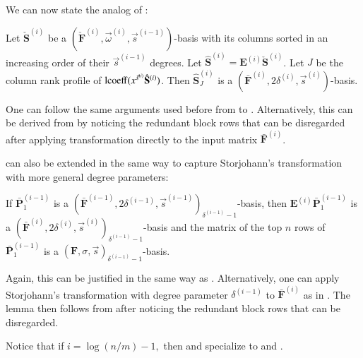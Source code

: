 We can now state the analog of : 
\begin{thm}
\label{thm:extractingOrderBasis}Let $\check{\mathbf{S}}^{\left(i\right)}$
be a $(\check{\mathbf{F}}^{\left(i\right)},\vec{\omega}^{\left(i\right)},\vec{s}^{\left(i-1\right)})$-basis
with its columns sorted in an increasing order of their $\vec{s}^{\left(i-1\right)}$
degrees. Let $\hat{\mathbf{S}}^{\left(i\right)}=\mathbf{E}^{\left(i\right)}\check{\mathbf{S}}^{\left(i\right)}$.
Let $J$ be the column rank profile of $\operatorname{lcoeff}(x^{\vec{s}^{\left(i\right)}}\hat{\mathbf{S}}^{\left(i\right)})$.
Then $\hat{\mathbf{S}}_{J}^{\left(i\right)}$ is a $(\bar{\mathbf{F}}^{\left(i\right)},2\delta^{\left(i\right)},\vec{s}^{\left(i\right)})$-basis.\end{thm}
\begin{pf}
One can follow the same arguments used before from 
to . Alternatively, this
can be derived from  by
noticing the redundant block rows that can be disregarded after applying
transformation  directly to the
input matrix $\bar{\mathbf{F}}^{\left(i\right)}$. 
\end{pf}
 can also be extended in the same way
to capture Storjohann's transformation with more general degree parameters: 
\begin{lem}
\label{lem:linkStorjohanTransform}If $\bar{\mathbf{P}}_{1}^{\left(i-1\right)}$
is a $(\bar{\mathbf{F}}^{\left(i-1\right)},2\delta^{\left(i-1\right)},\vec{s}^{\left(i-1\right)})_{\delta^{\left(i-1\right)}-1}$-basis,
then $\mathbf{E}^{\left(i\right)}\bar{\mathbf{P}}_{1}^{\left(i-1\right)}$
is a $(\bar{\mathbf{F}}^{\left(i\right)},2\delta^{\left(i\right)},\vec{s}^{\left(i\right)})_{\delta^{\left(i-1\right)}-1}$-basis
and the matrix of the top $n$ rows of $\bar{\mathbf{P}}_{1}^{\left(i-1\right)}$
is a $(\mathbf{F},\sigma,\vec{s})_{\delta^{\left(i-1\right)}-1}$-basis.\end{lem}
\begin{pf}
Again, this can be justified in the same way as .
Alternatively, one can apply Storjohann's transformation with degree
parameter $\delta^{\left(i-1\right)}$ to $\bar{\mathbf{F}}^{\left(i\right)}$
as in . The lemma then
follows from  after noticing the redundant
block rows that can be disregarded. 
\end{pf}
Notice that if $i=\log\left(n/m\right)-1,$ then 
and  specialize to 
and . 
